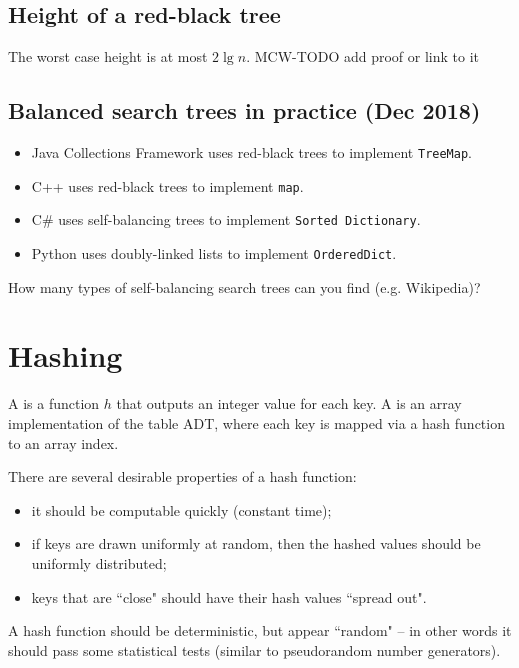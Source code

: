 \section{Height of a red-black tree}
The worst case height is at most $2 \lg n$.
MCW-TODO add proof or link to it

\section{Balanced search trees in practice (Dec 2018)}
\begin{itemize}
\item Java Collections Framework uses red-black trees to implement \texttt{TreeMap}.
\item C++ uses red-black trees to implement \texttt{map}.
\item C\# uses self-balancing trees to implement \texttt{Sorted Dictionary}.
\item Python uses doubly-linked lists to implement \texttt{OrderedDict}.
\end{itemize}

\begin{Boxample}[2]
How many types of self-balancing search trees can you find (e.g. Wikipedia)?
\end{Boxample}



\chapter{Hashing} %
\begin{Definition}
A  is a function $h$ that outputs an integer value for each key. 
A  is an array implementation of the table ADT, 
where each key is mapped via a hash function to an array index. 
\end{Definition}

There are several desirable properties of a hash function:
\begin{itemize}
\item it should be computable quickly (constant time);
\item if keys are drawn uniformly at random, then the hashed values
should be uniformly distributed;
\item keys that are ``close" should have their hash values ``spread out". 
\end{itemize}
A hash function should be deterministic, but appear ``random" -- in other 
words it should pass some statistical tests (similar to pseudorandom number generators). 


